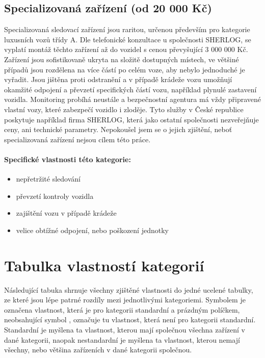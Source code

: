 \documentclass[FM,MP]{tulthesis}  %
\begin{document}
\subsection{Specializovaná zařízení (od 20 000 Kč)}
Specializovaná sledovací zařízení jsou raritou, určenou především pro kategorie luxusních vozů třídy A. Dle telefonické konzultace u společnosti SHERLOG, se vyplatí montáž těchto zařízení až do vozidel s cenou převyšující 3 000 000 Kč. Zařízení jsou sofistikovaně ukryta na složitě dostupných místech, ve většiné případů jsou rozdělena na více částí po celém voze, aby nebylo jednoduché je vyřadit. Jsou jištěna proti odstranění a v případě krádeže vozu umožňují okamžité odpojení a převzetí specifických částí vozu, například plynulé zastavení vozidla. Monitoring probíhá neustále a bezpečnostní agentura má vždy připravené vlastní vozy, které zabezpečí vozidlo i zloděje. Tyto služby v České republice poskytuje například firma SHERLOG, která jako ostatní společnosti nezveřejňuje ceny, ani technické parametry. Nepokoušel jsem se o jejich zjištění, neboť specializovaná zařízení nejsou cílem této práce. 

\paragraph{Specifické vlastnosti této kategorie:}
\begin{itemize}
\item nepřetržité sledování
\item převzetí kontroly vozidla
\item zajištění vozu v případě krádeže
\item velice obtížné odpojení, nebo poškození jednotky
\end{itemize}


\section{Tabulka vlastností kategorií}
Následující tabuka shrnuje všechny zjištěné vlastnosti do jedné ucelené tabulky, ze které jsou lépe patrné rozdíly mezi jednotlivými kategoriemi. Symbolem  je označena vlastnost, která je pro kategorii standardní a prázdným políčkem, neobsahující symbol , označuje tu vlastnost, která není pro kategorii standardní. Standardní je myšlena ta vlastnost, kterou mají společnou všechna zařízení v dané kategorii, naopak nestandardní je myšlena ta vlastnost, kterou nemají všechny, nebo většina zařízeních v dané kategorii společnou.
\end{document}
